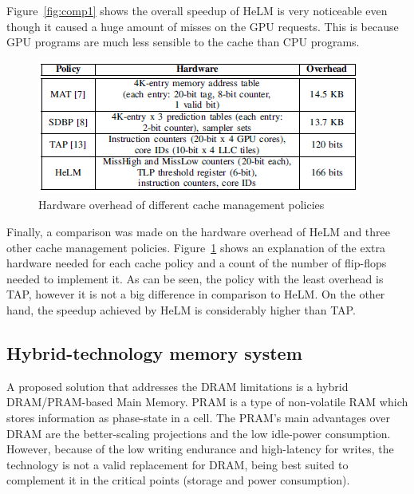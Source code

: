 \documentclass[12pt,journal,compsoc]{IEEEtran}
\begin{document}
Figure~\ref{fig:comp1} shows the overall speedup of HeLM is very noticeable even though it caused a huge amount of misses on the GPU requests. This is because GPU programs are much less sensible to the cache than CPU programs.

\begin{figure}[H]
	\centering
	\includegraphics[width = 8 cm]{graphics/LLChardware.png}
	\caption{Hardware overhead of different cache management policies \cite{LLC}}\label{fig:LLChw}
\end{figure}

Finally, a comparison was made on the hardware overhead of HeLM and three other cache management policies. Figure~\ref{fig:LLChw} shows an explanation of the extra hardware needed for each cache policy and a count of the number of flip-flops needed to implement it. As can be seen, the policy with the least overhead is TAP, however it is not a big difference in comparison to HeLM. On the other hand, the speedup achieved by HeLM is considerably higher than TAP.

\subsection{Hybrid-technology memory system}
A proposed solution that addresses the DRAM limitations is a hybrid DRAM/PRAM-based Main Memory. PRAM is a type of non-volatile RAM which stores information as phase-state in a cell. The PRAM’s main advantages over DRAM  are the better-scaling projections and the low idle-power consumption. However, because of the low writing endurance and high-latency for writes, the technology is not a valid replacement for DRAM, being best suited to complement it in the critical points (storage and power consumption).
\end{document}
